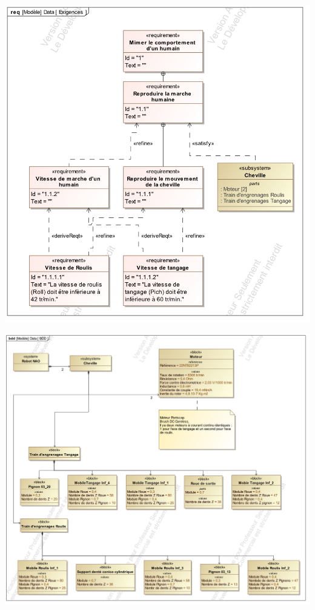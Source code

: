 \documentclass[10pt]{article}
\begin{document}
\begin{minipage}[c]{.5\linewidth}
\begin{center}
\includegraphics[width=.95\textwidth]{images/Req}
\end{center}
\end{minipage} \hfill
\begin{minipage}[c]{.5\linewidth}
\begin{center}
\includegraphics[width=\textwidth]{images/BDD}
\end{center}
\end{minipage}
\end{document}

